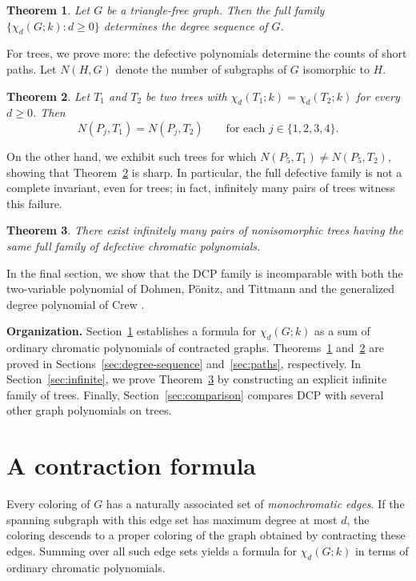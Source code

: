\documentclass[12pt,reqno]{amsart}
\newtheorem{thm}{Theorem}[section]
\theoremstyle{definition}
\begin{document}
\begin{thm}\label{thm:intro-degree-sequence}
Let $G$ be a triangle-free graph. Then the full family $\{\chi_d(G;k): d\geq 0\}$ determines the degree sequence of $G$.
\end{thm}

For trees, we prove more: the defective polynomials determine the counts of short paths. Let $N(H, G)$ denote the number of subgraphs of $G$ isomorphic to $H$.

\begin{thm}\label{thm:intro-path-counts}
Let $T_1$ and $T_2$ be two trees with $\chi_d(T_1;k)=\chi_d(T_2;k)$ for every $d\geq 0$. Then
\[
N(P_j,T_1)=N(P_j,T_2)\qquad\text{for each }j\in\{1,2,3,4\}.
\]
\end{thm}

On the other hand, we exhibit such trees for which $N(P_5,T_1)\neq N(P_5,T_2)$, showing that Theorem~\ref{thm:intro-path-counts} is sharp. In particular, the full defective family is not a complete invariant, even for trees; in fact, infinitely many pairs of trees witness this failure.

\begin{thm}\label{thm:intro-infinite}
There exist infinitely many pairs of nonisomorphic trees having the same full family of defective chromatic polynomials.
\end{thm}

In the final section, we show that the DCP family is incomparable with both the two-variable polynomial of Dohmen, P\"onitz, and Tittmann \cite{DPT03} and the generalized degree polynomial of Crew \cite{Cre20}.

\medskip
\noindent\textbf{Organization.}
Section~\ref{sec:contraction} establishes a formula for $\chi_d(G;k)$ as a sum of ordinary chromatic polynomials of contracted graphs. Theorems~\ref{thm:intro-degree-sequence} and~\ref{thm:intro-path-counts} are proved in Sections~\ref{sec:degree-sequence} and~\ref{sec:paths}, respectively. In Section~\ref{sec:infinite}, we prove Theorem~\ref{thm:intro-infinite} by constructing an explicit infinite family of trees. Finally, Section~\ref{sec:comparison} compares DCP with several other graph polynomials on trees.

\section{A contraction formula}\label{sec:contraction}

Every coloring of $G$ has a naturally associated set of \emph{monochromatic edges}. If the spanning subgraph with this edge set has maximum degree at most $d$, the coloring descends to a proper coloring of the graph obtained by contracting these edges. Summing over all such edge sets yields a formula for $\chi_d(G;k)$ in terms of ordinary chromatic polynomials.
\end{document}
